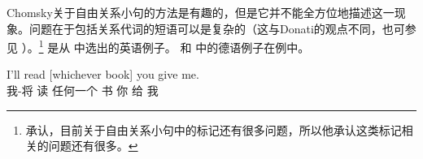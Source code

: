 
Chomsky关于自由关系小句的方法是有趣的，但是它并不能全方位地描述这一现象。问题在于包括关系代词的短语可以是复杂的（这与Donati的观点不同，也可参见 ）。\footnote{%
\citet[]{Chomsky2013a}承认，目前关于自由关系小句中的标记还有很多问题，所以他承认这类标记相关的问题还有很多。
} 是从 \citet[]{BG78}中选出的英语例子。 和  中的德语例子在例中。

\ea
\gll I'll read [whichever book] you give me.\\
     我-将 读   \spacebr{}任何一个 书 你 给 我\\
\z

